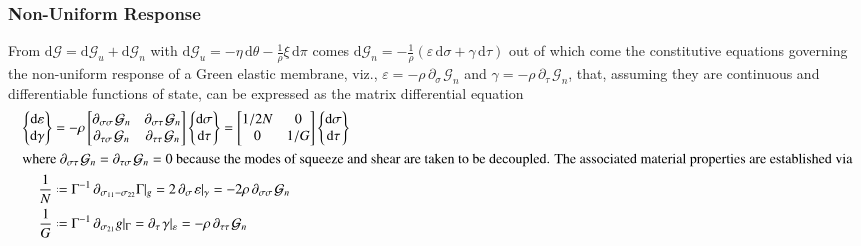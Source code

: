 \subsubsection{Non-Uniform Response}

From $\mathrm{d} \mathcal{G} = \mathrm{d} \mathcal{G}_u + \mathrm{d} \mathcal{G}_n$ with $\mathrm{d} \mathcal{G}_u = -\eta \, \mathrm{d} \theta - \tfrac{1}{\rho} \xi \, \mathrm{d} \pi$ comes $\mathrm{d} \mathcal{G}_n = -\tfrac{1}{\rho} ( \varepsilon \, \mathrm{d} \sigma + \gamma \, \mathrm{d} \tau )$ out of which come the constitutive equations governing the non-uniform response of a Green elastic membrane, viz., $\varepsilon = -\rho \, \partial_{\sigma\,} \mathcal{G}_n$ and $\gamma = -\rho \, \partial_{\tau\,} \mathcal{G}_n$, that, assuming they are continuous and differentiable functions of state, can be expressed as the matrix differential equation
\begin{subequations}
    \begin{align}
    \left\{ \begin{matrix}
    \mathrm{d} \varepsilon \\ \mathrm{d} \gamma
    \end{matrix} \right\}  & = -\rho \begin{bmatrix}
    \partial_{\sigma\sigma\,} \mathcal{G}_n & 
    \partial_{\sigma\tau\,} \mathcal{G}_n \\
    \partial_{\tau\sigma\,} \mathcal{G}_n &
    \partial_{\tau\tau\,} \mathcal{G}_n
    \end{bmatrix}
    \left\{ \begin{matrix}  
    \mathrm{d} \sigma \\ \mathrm{d} \tau
    \end{matrix} \right\} = \begin{bmatrix}
    1/2 N & 0 \\ 
    0 & 1 / G
    \end{bmatrix} \left\{ \begin{matrix}
    \mathrm{d} \sigma \\ \mathrm{d} \tau
    \end{matrix} \right\} \\
    \intertext{where $\partial_{\sigma\tau\,} \mathcal{G}_n = \partial_{\tau\sigma\,} \mathcal{G}_n = 0$ because the modes of squeeze and shear are taken to be decoupled.  The associated material properties are established via}
    \frac{1}{N} & \defeq \Gamma^{-1} \, \partial_{\sigma_{11} - \sigma_{22}} \Gamma |_g = 2 \, \partial_{\sigma\,} \varepsilon |_{\gamma} = -2 \rho \, \partial_{\sigma\sigma\,} \mathcal{G}_n 
    \label{squeezeModulus} \\
    \frac{1}{G} & \defeq \Gamma^{-1} \, \partial_{\sigma_{21}} g |_{\Gamma} = \partial_{\tau\,} \gamma |_{\varepsilon} = -\rho \, \partial_{\tau\tau\,} \mathcal{G}_n 
    \label{shearModulus}
    \end{align}
\end{subequations}
